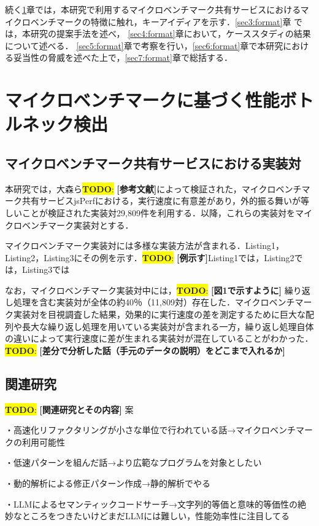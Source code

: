 \documentclass[submit,techrep,noauthor]{ipsj}
\newcommand{\todo}[1]{\colorbox{yellow}{{\bf TODO}:}{\color{red} {\textbf{[#1]}}}}
\begin{document}
続く\ref{sec2:format}章では，本研究で利用するマイクロベンチマーク共有サービスにおけるマイクロベンチマークの特徴に触れ，キーアイディアを示す．\ref{sec3:format}章 では，本研究の提案手法を述べ， \ref{sec4:format}章において，ケーススタディの結果について述べる． \ref{sec5:format}章で考察を行い，\ref{sec6:format}章で本研究における妥当性の脅威を述べた上で，\ref{sec7:format}章で総括する． 


\section{マイクロベンチマークに基づく性能ボトルネック検出}
\label{sec2:format}

\subsection{マイクロベンチマーク共有サービスにおける実装対}

本研究では，大森ら\todo{参考文献}によって検証された，マイクロベンチマーク共有サービスjsPerfにおける，実行速度に有意差があり，外的振る舞いが等しいことが検証された実装対29,809件を利用する．以降，これらの実装対をマイクロベンチマーク実装対とする．

マイクロベンチマーク実装対には多様な実装方法が含まれる．Listing1，Listing2，Listing3にその例を示す．\todo{例示す}Listing1では，Listing2では，Listing3では

なお，マイクロベンチマーク実装対中には，\todo{図1で示すように} 繰り返し処理を含む実装対が全体の約40％（11,809対）存在した．マイクロベンチマーク実装対を目視調査した結果，効果的に実行速度の差を測定するために巨大な配列や長大な繰り返し処理を用いている実装対が含まれる一方，繰り返し処理自体の違いによって実行速度に差が生まれる実装対が混在していることがわかった．\todo{差分で分析した話（手元のデータの説明）をどこまで入れるか}


\subsection{関連研究}

\todo{関連研究とその内容}
案

・高速化リファクタリングが小さな単位で行われている話→マイクロベンチマークの利用可能性

・低速パターンを組んだ話→より広範なプログラムを対象としたい

・動的解析による修正パターン作成→静的解析でやる

・LLMによるセマンティックコードサーチ→文字列的等価と意味的等価性の絶妙なところをつきたいけどまだLLMには難しい，性能効率性に注目してる
\end{document}
